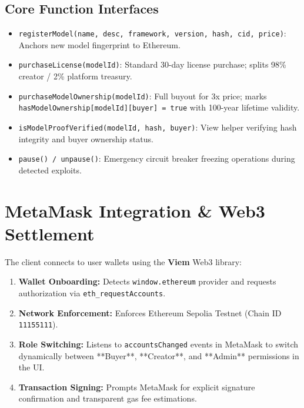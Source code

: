 \documentclass[12pt,a4paper]{article}
\begin{document}
\subsection{Core Function Interfaces}
\begin{itemize}[leftmargin=1.5em]
    \item \texttt{registerModel(name, desc, framework, version, hash, cid, price)}: Anchors new model fingerprint to Ethereum.
    \item \texttt{purchaseLicense(modelId)}: Standard 30-day license purchase; splits 98\% creator / 2\% platform treasury.
    \item \texttt{purchaseModelOwnership(modelId)}: Full buyout for 3x price; marks \texttt{hasModelOwnership[modelId][buyer] = true} with 100-year lifetime validity.
    \item \texttt{isModelProofVerified(modelId, hash, buyer)}: View helper verifying hash integrity and buyer ownership status.
    \item \texttt{pause() / unpause()}: Emergency circuit breaker freezing operations during detected exploits.
\end{itemize}

\section{MetaMask Integration \& Web3 Settlement}

The client connects to user wallets using the \textbf{Viem} Web3 library:
\begin{enumerate}[label=\textbf{\arabic*.}]
    \item \textbf{Wallet Onboarding:} Detects \texttt{window.ethereum} provider and requests authorization via \texttt{eth\_requestAccounts}.
    \item \textbf{Network Enforcement:} Enforces Ethereum Sepolia Testnet (Chain ID \texttt{11155111}).
    \item \textbf{Role Switching:} Listens to \texttt{accountsChanged} events in MetaMask to switch dynamically between **Buyer**, **Creator**, and **Admin** permissions in the UI.
    \item \textbf{Transaction Signing:} Prompts MetaMask for explicit signature confirmation and transparent gas fee estimations.
\end{enumerate}
\end{document}
